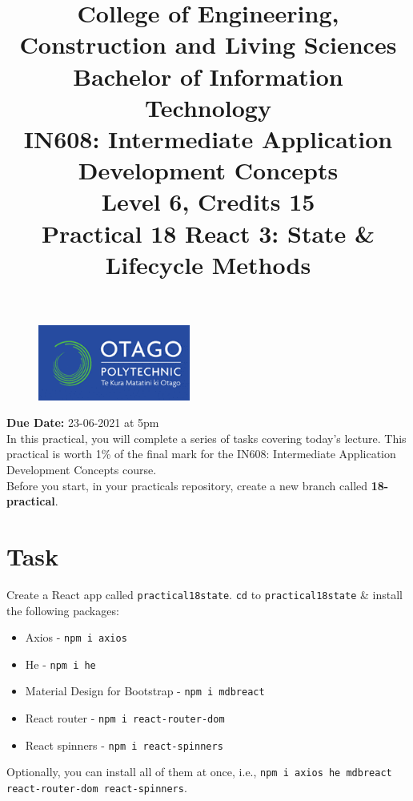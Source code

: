 \documentclass{article}
\author{}
\begin{document}
\begin{figure}
	\centering
	\includegraphics[width=50mm]{./img/logo.png}
\end{figure}

\title{College of Engineering, Construction and Living Sciences\\Bachelor of Information Technology\\IN608: Intermediate Application Development Concepts\\Level 6, Credits 15\\\textbf{Practical 18 React 3: State \& Lifecycle Methods}} 
\date{}
\maketitle

\textbf{Due Date:} 23-06-2021 at 5pm \\

In this practical, you will complete a series of tasks covering today's lecture. This practical is worth 1\% of the final mark for the IN608: Intermediate Application Development Concepts course. \\

Before you start, in your practicals repository, create a new branch called \textbf{18-practical}.

\section*{Task} 
Create a React app called \texttt{practical18state}. \texttt{cd} to \texttt{practical18state} \& install the following packages:
\begin{itemize}
  \item Axios - \texttt{npm i axios}
  \item He - \texttt{npm i he}
  \item Material Design for Bootstrap - \texttt{npm i mdbreact}
  \item React router - \texttt{npm i react-router-dom}
  \item React spinners - \texttt{npm i react-spinners}
\end{itemize}

Optionally, you can install all of them at once, i.e., \texttt{npm i axios he mdbreact react-router-dom react-spinners}. \\
\end{document}
